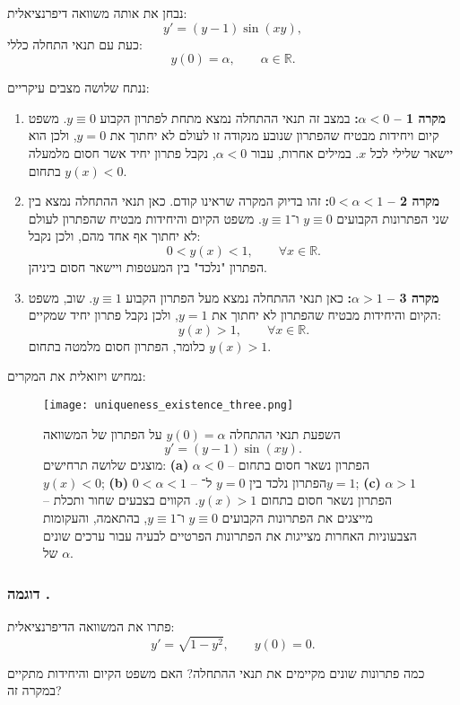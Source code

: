 \documentclass{article}
\numberwithin{equation}{section}
\newcounter{example}[section]
\renewcommand{\theexample}{\thesection.\arabic{example}}
\newcommand{\example}[1][]{%
  \refstepcounter{example}%
  \subsubsection*{דוגמה \theexample\; #1}%
  \label{exm:\theexample}%
}
\begin{document}
נבחן את אותה משוואה דיפרנציאלית:
\[
y' = (y-1)\sin(xy),
\]
כעת עם תנאי התחלה כללי:
\[
y(0)=\alpha,\qquad  \alpha\in\mathbb{R}.
\]

ננתח שלושה מצבים עיקריים:

\begin{enumerate}
\item \textbf{מקרה 1 – $\alpha < 0$:}  
במצב זה תנאי ההתחלה נמצא מתחת לפתרון הקבוע $y\equiv 0$.  
משפט קיום ויחידות מבטיח שהפתרון שנובע מנקודה זו לעולם לא יחתוך את $y=0$, ולכן הוא יישאר שלילי לכל $x$.  
במילים אחרות, עבור $\alpha<0$, נקבל פתרון יחיד אשר חסום מלמעלה בתחום $y(x)<0$.  

\item \textbf{מקרה 2 – $0<\alpha<1$:}  
זהו בדיוק המקרה שראינו קודם.  
כאן תנאי ההתחלה נמצא בין שני הפתרונות הקבועים $y\equiv 0$ ו־$y\equiv 1$.  
משפט הקיום והיחידות מבטיח שהפתרון לעולם לא יחתוך אף אחד מהם, ולכן נקבל:
\[
0<y(x)<1, \qquad \forall x\in\mathbb{R}.
\]
הפתרון "נלכד" בין המעטפות ויישאר חסום ביניהן.  

\item \textbf{מקרה 3 – $\alpha>1$:}  
כאן תנאי ההתחלה נמצא מעל הפתרון הקבוע $y\equiv 1$.  
שוב, משפט הקיום והיחידות מבטיח שהפתרון לא יחתוך את $y=1$, ולכן נקבל פתרון יחיד שמקיים:
\[
y(x)>1, \qquad \forall x\in\mathbb{R}.
\]
כלומר, הפתרון חסום מלמטה בתחום $y(x)>1$. 
\end{enumerate}
נמחיש ויזואלית את המקרים:

\begin{figure}[H]
    \centering
    \texttt{[image: uniqueness\_existence\_three.png]}
    \caption{השפעת תנאי ההתחלה $y(0)=\alpha$ על הפתרון של המשוואה
    \[
    y'=(y-1)\sin(xy).
    \]
    מוצגים שלושה תרחישים: 
    \textbf{(a)} $\alpha<0$ – הפתרון נשאר חסום בתחום $y(x)<0$; 
    \textbf{(b)} $0<\alpha<1$ – הפתרון נלכד בין $y=0$ ל־$y=1$; 
    \textbf{(c)} $\alpha>1$ – הפתרון נשאר חסום בתחום $y(x)>1$.  
    הקווים בצבעים שחור ותכלת מייצגים את הפתרונות הקבועים $y\equiv 0$ ו־$y\equiv 1$, בהתאמה,  
    והעקומות הצבעוניות האחרות מצייגות את הפתרונות הפרטיים לבעיה עבור ערכים שונים של $\alpha$.}
    \label{fig:uniqueness_alpha_cases}
\end{figure}

\example{}\label{special_sine}

פתרו את המשוואה הדיפרנציאלית:
\[
y' = \sqrt{1-y^2}, 
\qquad y(0)=0.
\]

כמה פתרונות שונים מקיימים את תנאי ההתחלה?  
האם משפט הקיום והיחידות מתקיים במקרה זה?
\end{document}
